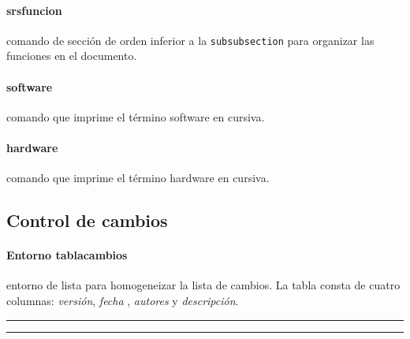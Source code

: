 \documentclass[draft]{ltxdoc}
\begin{document}
	\paragraph{srsfuncion}comando de sección de orden inferior a la \verb|subsubsection| para organizar las funciones en el documento.
	\paragraph{software}comando que imprime el término software en cursiva.
	\paragraph{hardware}comando que imprime el término hardware en cursiva.

\subsection{Control de cambios}
	\paragraph{Entorno tablacambios}{entorno de lista para homogeneizar la lista de cambios. La tabla consta de cuatro columnas: \textit{versión}, \textit{fecha} , \textit{autores} y \textit{descripción}.}


	\ifpdf
		\vspace*{\fill}
		\begin{center}
			\color{gray} \hrule
			\hrule
		\end{center}
	\fi
\end{document}
